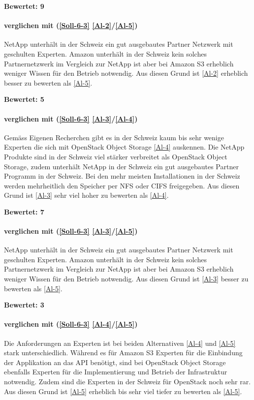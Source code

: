 \textbf{Bewertet: 9}

\paragraph*{  verglichen mit  (\ref{Soll-6-3} \ref{Al-2}/\ref{Al-5})}
NetApp unterhält in der Schweiz ein gut ausgebautes Partner Netzwerk mit geschulten Experten. Amazon unterhält in der Schweiz kein solches Partnernetzwerk im Vergleich zur NetApp ist aber bei Amazon S3 erheblich weniger Wissen für den Betrieb notwendig. Aus diesen Grund ist  \ref{Al-2} erheblich besser zu bewerten als  \ref{Al-5}.

\textbf{Bewertet: 5}

\paragraph*{  verglichen mit  (\ref{Soll-6-3} \ref{Al-3}/\ref{Al-4})}
Gemäss Eigenen Recherchen gibt es in der Schweiz kaum bis sehr wenige Experten die sich mit OpenStack Object Storage \ref{Al-4} auskennen. Die NetApp Produkte sind in der Schweiz viel stärker verbreitet als OpenStack Object Storage, zudem unterhält NetApp in der Schweiz ein gut ausgebautes Partner Programm in der Schweiz. Bei den mehr meisten Installationen in der Schweiz werden mehrheitlich den Speicher per NFS oder CIFS freigegeben. Aus diesen Grund ist  \ref{Al-3} sehr viel hoher zu bewerten als  \ref{Al-4}.

\textbf{Bewertet: 7}


\paragraph*{  verglichen mit  (\ref{Soll-6-3} \ref{Al-3}/\ref{Al-5})}
NetApp unterhält in der Schweiz ein gut ausgebautes Partner Netzwerk mit geschulten Experten. Amazon unterhält in der Schweiz kein solches Partnernetzwerk im Vergleich zur NetApp ist aber bei Amazon S3 erheblich weniger Wissen für den Betrieb notwendig. Aus diesen Grund ist  \ref{Al-3} besser zu bewerten als  \ref{Al-5}.

\textbf{Bewertet: 3}


\paragraph*{  verglichen mit  (\ref{Soll-6-3} \ref{Al-4}/\ref{Al-5})}
Die Anforderungen an Experten ist bei beiden Alternativen \ref{Al-4} und \ref{Al-5} stark unterschiedlich. Während es für Amazon S3 Experten für die Einbindung der Applikation an das API benötigt, sind bei OpenStack Object Storage ebenfalls Experten für die Implementierung und Betrieb der Infrastruktur notwendig. Zudem sind die Experten in der Schweiz für OpenStack noch sehr rar. Aus diesen Grund ist \ref{Al-5} erheblich bis sehr viel tiefer zu bewerten als \ref{Al-5}.

